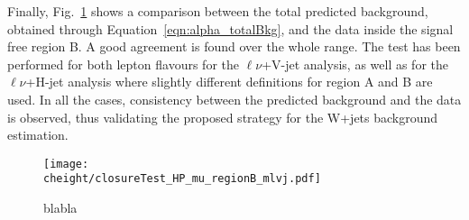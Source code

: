 Finally, Fig.~\ref{fig:mlvjSR_closureTest} shows a comparison between the total predicted background, obtained through Equation~\ref{eqn:alpha_totalBkg}, and the data inside the signal free region B.
A good agreement is found over the whole \mlvj range.
The test has been performed for both lepton flavours for the $\ell\nu$+V-jet analysis, as well as for the $\ell\nu$+H-jet analysis where slightly different definitions for region A and B are used.
In all the cases, consistency between the predicted background and the data is observed, thus validating the proposed strategy for the W+jets background estimation.

\begin{figure}[!htb]
\centering
\texttt{[image: \\cheight/closureTest\_HP\_mu\_regionB\_mlvj.pdf]}
\caption{blabla}
\label{fig:mlvjSR_closureTest}
\end{figure}

